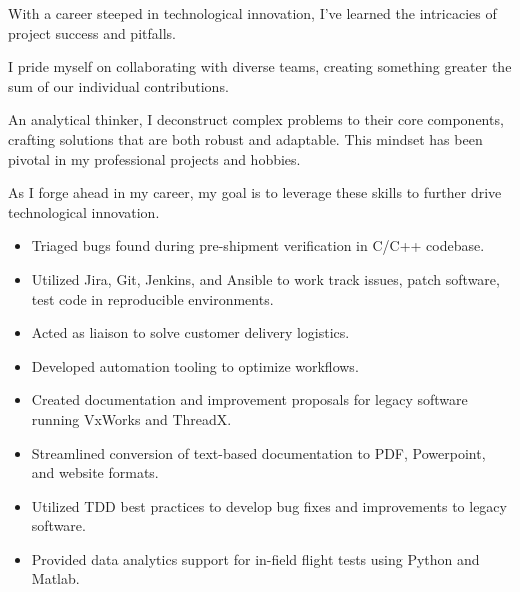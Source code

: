 \documentclass[a4paper,ragged2e,withhyper]{altacv}
\begin{document}
\vspace{0.25em}

With a career steeped in technological innovation, I've learned the intricacies of project success and pitfalls.

\vspace{0.25em}

I pride myself on collaborating with diverse teams, creating something greater the sum of our individual contributions.

\vspace{0.25em}

An analytical thinker, I deconstruct complex problems to their core components, crafting solutions that are both robust and adaptable. This mindset has been pivotal in my professional projects and hobbies.

\vspace{0.25em}

As I forge ahead in my career, my goal is to leverage these skills to further drive technological innovation.

\vspace{5em}
\begin{fullwidth}
\divider
\end{fullwidth}
\begin{fullwidth}
\end{fullwidth}
\label{sec:org7b8293c}

\begin{itemize}
\item Triaged bugs found during pre-shipment verification in C/C++ codebase.
\item Utilized Jira, Git, Jenkins, and Ansible to work track issues, patch software, test code in reproducible environments.
\item Acted as liaison to solve customer delivery logistics.
\item Developed automation tooling to optimize workflows.
\item Created documentation and improvement proposals for legacy software running VxWorks and ThreadX.
\item Streamlined conversion of text-based documentation to PDF, Powerpoint, and website formats.
\item Utilized TDD best practices to develop bug fixes and improvements to legacy software.
\item Provided data analytics support for in-field flight tests using Python and Matlab.
\end{itemize}
\end{document}
